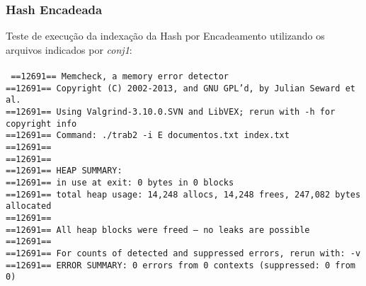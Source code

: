 \documentclass[
	11pt,				%
	oneside,			%
	a4paper,			%
	english,			%
	brazil,				%
	]{article}
\begin{document}
\subsubsection{Hash Encadeada}
Teste de execução da indexação da Hash por Encadeamento utilizando os arquivos indicados por \textit{conj1}:
\\\\
\texttt{
==12691== Memcheck, a memory error detector \\
==12691== Copyright (C) 2002-2013, and GNU GPL'd, by Julian Seward et al. \\
==12691== Using Valgrind-3.10.0.SVN and LibVEX; rerun with -h for copyright info \\
==12691== Command: ./trab2 -i E documentos.txt index.txt \\
==12691==  \\
==12691==  \\
==12691== HEAP SUMMARY: \\
==12691==     in use at exit: 0 bytes in 0 blocks \\
==12691==   total heap usage: 14,248 allocs, 14,248 frees, 247,082 bytes allocated \\
==12691==  \\
==12691== All heap blocks were freed -- no leaks are possible \\
==12691==  \\
==12691== For counts of detected and suppressed errors, rerun with: -v \\
==12691== ERROR SUMMARY: 0 errors from 0 contexts (suppressed: 0 from 0)
}
\end{document}
